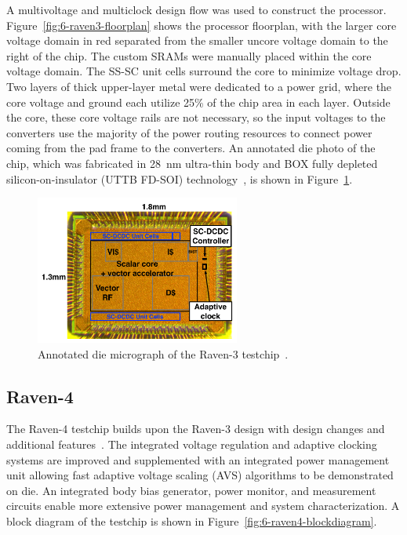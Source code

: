 \documentclass[graybox]{svmult}
\begin{document}
A multivoltage and multiclock design flow was used to construct the processor.
Figure~\ref{fig:6-raven3-floorplan} shows the processor floorplan, with the larger core voltage domain in red separated from the smaller uncore voltage domain to the right of the chip.
The custom SRAMs were manually placed within the core voltage domain.
The SS-SC unit cells surround the core to minimize voltage drop.
Two layers of thick upper-layer metal were dedicated to a power grid, where the core voltage and ground each utilize 25\% of the chip area in each layer.
Outside the core, these core voltage rails are not necessary, so the input voltages to the converters use the majority of the power routing resources to connect power coming from the pad frame to the converters.
An annotated die photo of the chip, which was fabricated in \SI{28}{\nano\meter} ultra-thin body and BOX fully depleted silicon-on-insulator (UTTB FD-SOI) technology~\cite{Flatresse2013}, is shown in Figure~\ref{fig:6-raven3-diephoto}.

\begin{figure}
  \centering
  \includegraphics[width=0.6\textwidth]{6-raven3-diephoto}
  \caption{Annotated die micrograph of the Raven-3 testchip~\cite{Zimmer2016}.}
  \label{fig:6-raven3-diephoto}
\end{figure}



\subsection{Raven-4}

The Raven-4 testchip builds upon the Raven-3 design with design changes and additional features~\cite{Keller2017}.
The integrated voltage regulation and adaptive clocking systems are improved and supplemented with an integrated power management unit allowing fast adaptive voltage scaling (AVS) algorithms to be demonstrated on die.
An integrated body bias generator, power monitor, and measurement circuits enable more extensive power management and system characterization.
A block diagram of the testchip is shown in Figure~\ref{fig:6-raven4-blockdiagram}.
\end{document}
